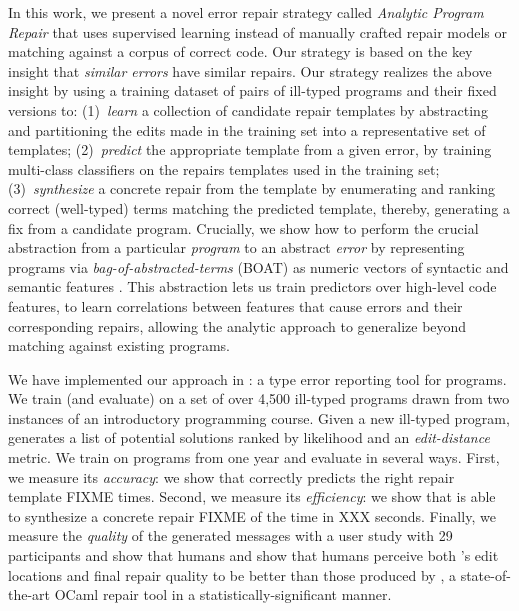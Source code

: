 %
In this work, we present a novel error repair 
strategy called \emph{Analytic Program Repair} 
that uses supervised learning instead of manually 
crafted repair models or matching against a corpus 
of correct code.
%
Our strategy is based on the key insight that 
\emph{similar errors} have similar repairs.
%
Our strategy realizes the above insight by using 
a training dataset of pairs of ill-typed programs 
and their fixed versions to: 
%
(1)~\emph{learn} a collection of candidate repair templates 
    by abstracting and partitioning the edits made in the 
    training set into a representative set of templates;
%
(2)~\emph{predict} the appropriate template from a given error, 
    by training multi-class classifiers on the repairs templates 
    used in the training set; 
%
(3)~\emph{synthesize} a concrete repair from the template 
   by enumerating and ranking correct (\eg well-typed) 
   terms matching the predicted template, 
%
thereby, generating a fix from a candidate program.
%
Crucially, we show how to perform the crucial abstraction 
from a particular \emph{program} to an abstract \emph{error} 
by representing programs via \emph{bag-of-abstracted-terms} (BOAT) 
\ie as numeric vectors of syntactic and semantic features \cite{Seidel2017-ko}. 
%
This abstraction lets us train predictors over high-level 
code features, \ie to learn correlations between features 
that cause errors and their corresponding repairs, allowing 
the analytic approach to generalize beyond matching against 
existing programs.

\mypara{\toolname}
%
We have implemented our approach in \toolname: a type error reporting 
tool for \ocaml programs. We train (and evaluate) \toolname on a set of 
over 4,500 ill-typed \ocaml programs drawn from two instances of an 
introductory programming course.
%
Given a new ill-typed program, \toolname generates a list of potential 
solutions ranked by likelihood and an \emph{edit-distance} metric. 
We train \toolname on programs from one year and evaluate in several 
ways.
%
First, we measure its \emph{accuracy}: we show that \toolname correctly 
predicts the right repair template {FIXME} times.
%
Second, we measure its \emph{efficiency}: we show that \toolname is able 
to synthesize a concrete repair {FIXME} of the time in XXX seconds.
%
Finally, we measure the \emph{quality} of the generated messages with 
a user study with 29 participants and show that humans and show that 
humans perceive both \toolname's edit locations and final repair quality 
to be better than those produced by \seminal, a state-of-the-art OCaml 
repair tool \cite{Lerner2007} in a statistically-significant manner.

